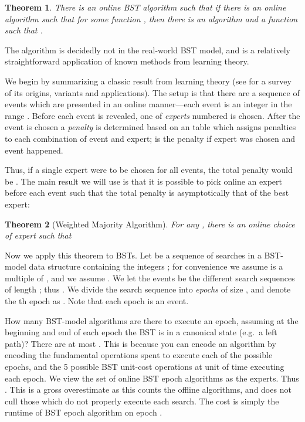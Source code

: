 \documentclass[11pt]{article}
\newtheorem{theorem}{Theorem}
\begin{document}
\begin{theorem} \label{tha}
There is an online BST algorithm  such that if there is an online algorithm  such that  for some function , then there is an algorithm  and a function  such that .
\end{theorem}

 The algorithm is decidedly not in the real-world BST model, and is a relatively straightforward application of known methods from learning theory.

We begin by summarizing a classic result from learning theory (see \cite{DBLP:journals/toc/AroraHK12} for a survey of its origins, variants and applications). The setup is that there are a sequence of events  which are presented in an online manner---each event is an integer in the range . Before each event is revealed, one of  \emph{experts} numbered  is chosen. After the event is chosen a \emph{penalty} is determined based on an  table  which assigns penalties to each combination of event and expert;  is the penalty if expert  was chosen and event  happened.

Thus, if a single expert  were to be chosen for all events, the total penalty would be 
. The main result we will use is that it is possible to pick online an expert before each event such that the total penalty is asymptotically that of the best expert:

\begin{theorem}[Weighted Majority Algorithm]
For any , there is an online choice of expert  such that


\end{theorem}

Now we apply this theorem to BSTs.
Let  be a sequence of searches in a BST-model data structure containing the integers ; for convenience we assume  is a multiple of , and we assume . 
We let the events be the  different search sequences of length ; thus .
We divide the search sequence into \textit{epochs} of size , and denote the th epoch as . Note that each epoch  is an event.

How many BST-model algorithms are there to execute an epoch, assuming at the beginning and end of each epoch the BST is in a canonical state (e.g.~a left path)? There are at most 
. This is because you can encode an algorithm by encoding the   fundamental operations spent to execute each of the  possible epochs, and the 5 possible BST unit-cost operations at unit of time executing each epoch. We view the set of online BST epoch algorithms as the experts. Thus . 
This is a gross overestimate as this counts the offline algorithms, and does not cull those which do not properly execute each search. The cost  is simply the runtime of BST epoch algorithm  on epoch .
\end{document}
